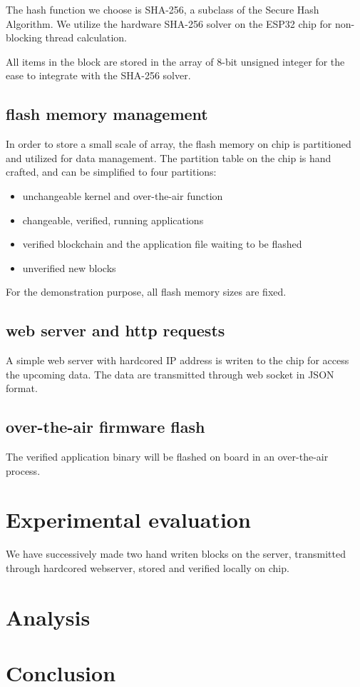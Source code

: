 \documentclass{article}
\begin{document}
        The hash function we choose is SHA-256, a subclass of the Secure Hash Algorithm. We utilize the hardware SHA-256 solver on the ESP32 chip for non-blocking thread calculation.

        All items in the block are stored in the array of 8-bit unsigned integer for the ease to integrate with the SHA-256 solver.

    \subsection{flash memory management}
        In order to store a small scale of array, the flash memory on chip is partitioned and utilized for data management. The partition table on the chip is hand crafted, and can be simplified to four partitions:
        \begin{itemize}
          \item unchangeable kernel and over-the-air function
          \item changeable, verified, running applications
          \item verified blockchain and the application file waiting to be flashed
          \item unverified new blocks
        \end{itemize}

        For the demonstration purpose, all flash memory sizes are fixed.

    \subsection{web server and http requests}
        A simple web server with hardcored IP address is writen to the chip for access the upcoming data. The data are transmitted through web socket in JSON format.

    \subsection{over-the-air firmware flash}
        The verified application binary will be flashed on board in an over-the-air process.

\section{Experimental evaluation}
    We have successively made two hand writen blocks on the server, transmitted through hardcored webserver, stored and verified locally on chip.

\section{Analysis}


\section{Conclusion}




\end{document}
